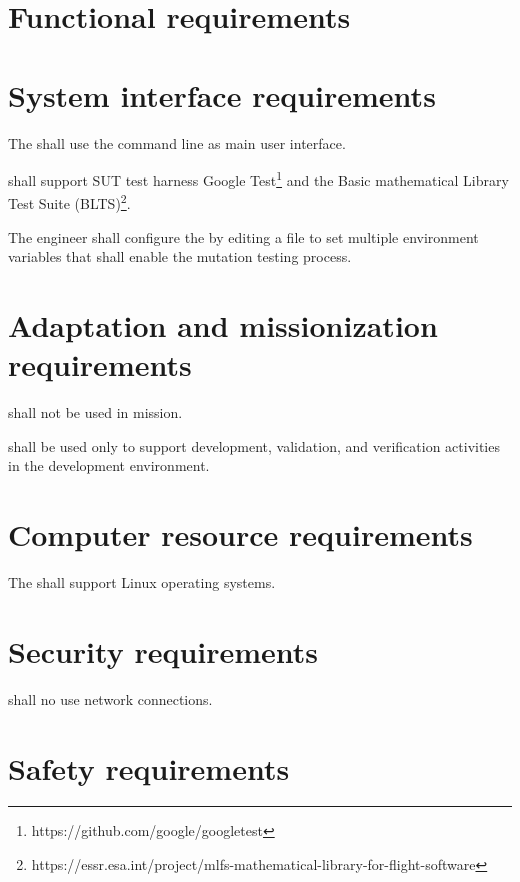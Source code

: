 \section{Functional requirements}
\label{sec:requirements}






\section{System interface requirements}

\RQ{} The \FAQAS shall use the command line as main user interface.

\RQ{} \FAQAS shall support SUT test harness Google Test\footnote{https://github.com/google/googletest} and the Basic mathematical Library Test Suite (BLTS)\footnote{https://essr.esa.int/project/mlfs-mathematical-library-for-flight-software}.

\RQ{} The engineer shall configure the \FAQAS by editing a file to set multiple environment variables that shall enable the mutation testing process.



\section{Adaptation and missionization requirements}

\RQ{} \FAQAS shall not be used in mission.

\RQ{} \FAQAS shall be used only to support development, validation, and verification activities in the development environment. 




\section{Computer resource requirements}


\RQ{} The \FAQAS shall support Linux operating systems.



\section{Security requirements }

\RQ{} \FAQAS shall no use network connections.

\section{Safety requirements}

